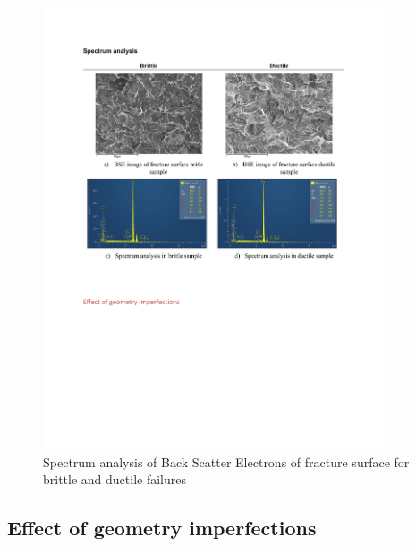 \begin{figure}[htbp]
	\centering
	\includegraphics[width=0.9\textwidth]{VAC Thesis 2.0/Chapter-4/figs/BBT_SpectrumAnalysis.pdf}
	\caption{Spectrum analysis of Back Scatter Electrons of fracture surface for brittle and ductile failures}
	\label{fig:SpectrumAnalysis}
\end{figure}

\subsection{Effect of geometry imperfections}
